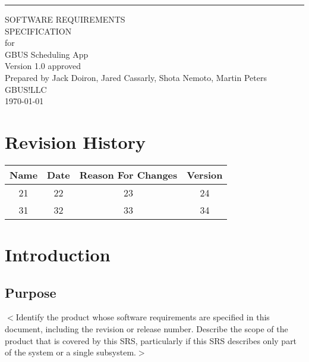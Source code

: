 \documentclass{scrreprt}
\date{}
\def\myversion{1.0 }
\begin{document}
\begin{flushright}
    \rule{16cm}{5pt}\vskip1cm
    \begin{bfseries}
        \Huge{SOFTWARE REQUIREMENTS\\ SPECIFICATION}\\
        \vspace{1.9cm}
        for\\
        \vspace{1.9cm}
        GBUS Scheduling App\\
        \vspace{1.9cm}
        \LARGE{Version \myversion approved}\\
        \vspace{1.9cm}
        Prepared by Jack Doiron, Jared Cassarly, Shota Nemoto, Martin Peters\\
        \vspace{1.9cm}
        GBUS!LLC\\
        \vspace{1.9cm}
        \today\\
    \end{bfseries}
\end{flushright}

\tableofcontents


\chapter*{Revision History}

\begin{center}
    \begin{tabular}{|c|c|c|c|}
        \hline
	    Name & Date & Reason For Changes & Version\\
        \hline
	    21 & 22 & 23 & 24\\
        \hline
	    31 & 32 & 33 & 34\\
        \hline
    \end{tabular}
\end{center}

\chapter{Introduction}

\section{Purpose}
$<$Identify the product whose software requirements are specified in this
document, including the revision or release number. Describe the scope of the
product that is covered by this SRS, particularly if this SRS describes only
part of the system or a single subsystem.$>$
\end{document}
